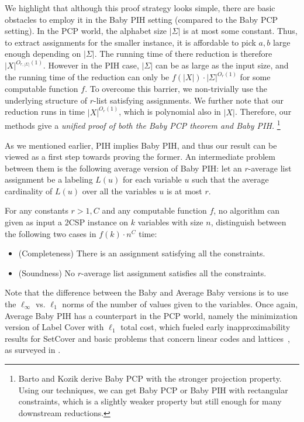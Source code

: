 We highlight that although this proof strategy looks simple, there are basic obstacles to employ it in the Baby PIH setting (compared to the Baby PCP setting). In the PCP world, the alphabet size $|\Sigma|$ is at most some constant. Thus, to extract assignments for the smaller instance, it is affordable to pick $a,b$ large enough depending on $|\Sigma|$. The running time of there reduction is therefore $|X|^{O_{r,|\Sigma|}(1)}$. However in the PIH case, $|\Sigma|$ can be as large as the input size, and the running time of the reduction can only be $f(|X|)\cdot |\Sigma|^{O_r(1)}$ for some computable function $f$. To overcome this barrier, we non-trivially use the underlying structure of $r$-list satisfying assignments. We further note that our reduction runs in time $|X|^{O_r(1)}$, which is polynomial also in $|X|$. Therefore, our methods give a \emph{unified proof of both the Baby PCP theorem and Baby PIH.} \footnote{Barto and Kozik \cite{BK22} derive Baby PCP with the stronger projection property. Using our techniques, we can get Baby PCP or Baby PIH with rectangular constraints, which is a slightly weaker property but still enough for many downstream reductions.}

As we mentioned earlier, PIH implies Baby PIH, and thus our result can be viewed as a first step towards proving the former. An intermediate problem between them is the following average version of Baby PIH: let an $r$-average list assignment be a labeling $L(u)$ for each variable $u$ such that the average cardinality of $L(u)$ over all the variables $u$ is at most $r$. 
\begin{conjecture}
For any constants $r >1,C$ and any computable function $f$, no algorithm can given as input a 2CSP instance on $k$ variables with size $n$, distinguish between the following two cases in $f(k)\cdot n^{C}$ time:
    \begin{itemize}
        \item (Completeness) There is an assignment satisfying all the constraints.
        \item (Soundness) No $r$-average list assignment satisfies all the constraints.
    \end{itemize}
\end{conjecture}

Note that the difference between the Baby and Average Baby versions is to use the $\ell_\infty$ vs. $\ell_1$ norms of the number of values given to the variables.
Once again, Average Baby PIH has a counterpart in the PCP world, namely the minimization version of Label Cover with $\ell_1$ total cost, which fueled early inapproximability results for {\sc SetCover} and basic problems that concern linear codes and lattices~\cite{ABSS97}, as surveyed in \cite{AL96}. 

